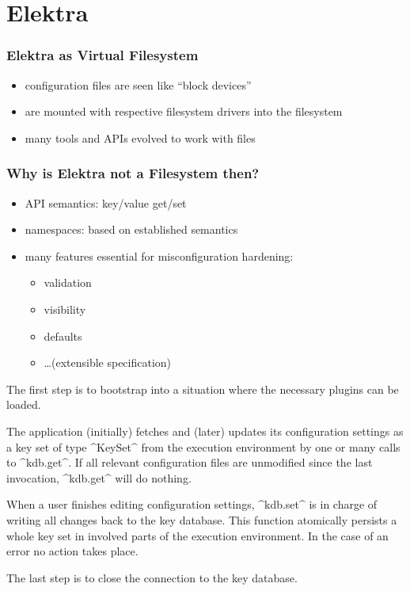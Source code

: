 \section{Elektra}


\begin{frame}
	\frametitle{Elektra as Virtual Filesystem}
	\begin{itemize}
	\item configuration files are seen like ``block devices''
	\item are mounted with respective filesystem drivers into the filesystem
	\item many tools and APIs evolved to work with files
	\end{itemize}
\end{frame}


\begin{frame}
	\frametitle{Why is Elektra not a Filesystem then?}
	\begin{itemize}
	\item API semantics: key/value get/set
	\item namespaces: based on established semantics
	\item many features essential for misconfiguration hardening:
		\begin{itemize}
		\item validation
		\item visibility
		\item defaults
		\item \dots (extensible specification)
		\end{itemize}
	\end{itemize}
\end{frame}


\begin{frame}[fragile]
	\begin{description}[align=left]
	\item[kdb.open():]
	The first step is to bootstrap into a situation where the necessary plugins can be loaded.
	\item[kdb.get(\texttt{KeySet}):] 
	The application (initially) fetches and (later) updates its configuration settings as a key set of type ^KeySet^ from the execution environment by one or many calls to ^kdb.get^.
	If all relevant configuration files are unmodified since the last invocation, ^kdb.get^ will do nothing.
	\item[kdb.set(\texttt{KeySet}):] 
	When a user finishes editing configuration settings, ^kdb.set^ is in charge of writing all changes back to the key database.
	This function atomically persists a whole key set in involved parts of the execution environment.
	In the case of an error no action takes place.
	\item[kdb.close():] 
	The last step is to close the connection to the key database.
	\end{description}
\end{frame}

